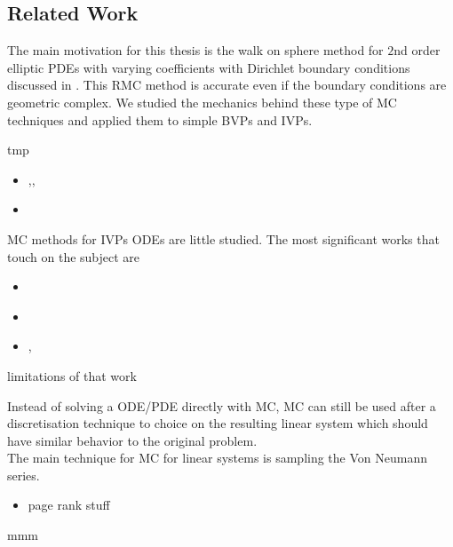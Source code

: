 \documentclass[a4paper,12pt]{article}
\begin{document}
\subsection{Related Work}
The main motivation for this thesis is the walk on sphere method for $2$nd order elliptic PDEs
with varying coefficients with Dirichlet boundary conditions
discussed in \cite{sawhney_grid-free_2022}. This RMC method
is accurate even if the boundary conditions are geometric complex. We studied the
mechanics behind these type of MC techniques and applied them to simple BVPs and IVPs.

\begin{related}
    tmp
    \begin{itemize}
        \item \cite{sawhney_walk_2023},\cite{sawhney_monte_nodate},\cite{sawhney_grid-free_2022}
        \item \cite{hwang_off-centered_2015}
    \end{itemize}
\end{related}

\begin{related}
    MC methods for IVPs ODEs are little studied. The most significant works that touch on
    the subject are
    \begin{itemize}
        \item \cite{jentzen_random_2009}
        \item \cite{daun_randomized_2011}
        \item \cite{ermakov_monte_2019}, \cite{ermakov_monte_2021}
    \end{itemize}
    limitations of that work

\end{related}

\begin{related}
    Instead of solving a ODE/PDE directly with MC, MC can still be used after
    a discretisation technique to choice on the resulting linear system
    which should have similar behavior to the original problem. \\
    The main technique for MC for linear systems is sampling
    the Von Neumann series.

    \begin{itemize}
        \item page rank stuff
    \end{itemize}

    mmm

\end{related}
\end{document}
